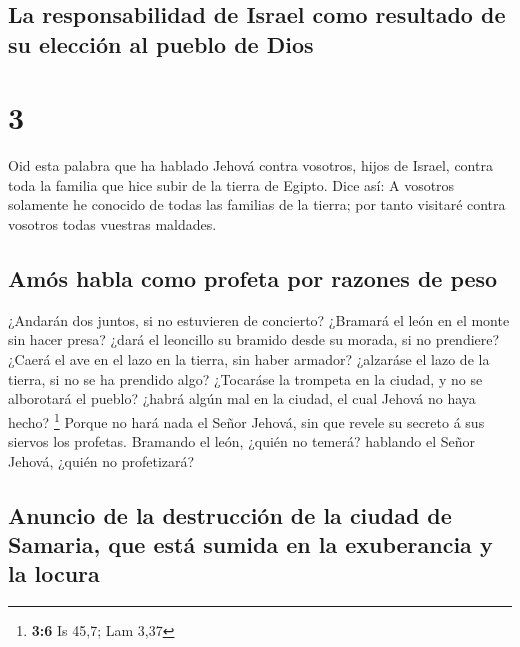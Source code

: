 \hypertarget{la-responsabilidad-de-israel-como-resultado-de-su-elecciuxf3n-al-pueblo-de-dios}{%
\subsection{La responsabilidad de Israel como resultado de su elección
al pueblo de
Dios}\label{la-responsabilidad-de-israel-como-resultado-de-su-elecciuxf3n-al-pueblo-de-dios}}

\hypertarget{section-2}{%
\section{3}\label{section-2}}

 Oid esta palabra que ha hablado Jehová contra vosotros,
hijos de Israel, contra toda la familia que hice subir de la tierra de
Egipto. Dice así:  A vosotros solamente he conocido de todas
las familias de la tierra; por tanto visitaré contra vosotros todas
vuestras maldades.

\hypertarget{amuxf3s-habla-como-profeta-por-razones-de-peso}{%
\subsection{Amós habla como profeta por razones de
peso}\label{amuxf3s-habla-como-profeta-por-razones-de-peso}}

 ¿Andarán dos juntos, si no estuvieren de concierto?
 ¿Bramará el león en el monte sin hacer presa? ¿dará el
leoncillo su bramido desde su morada, si no prendiere? 
¿Caerá el ave en el lazo en la tierra, sin haber armador? ¿alzaráse el
lazo de la tierra, si no se ha prendido algo?  ¿Tocaráse la
trompeta en la ciudad, y no se alborotará el pueblo? ¿habrá algún mal en
la ciudad, el cual Jehová no haya hecho? \footnote{\textbf{3:6} Is 45,7;
  Lam 3,37}  Porque no hará nada el Señor Jehová, sin que
revele su secreto á sus siervos los profetas.  Bramando el
león, ¿quién no temerá? hablando el Señor Jehová, ¿quién no profetizará?

\hypertarget{anuncio-de-la-destrucciuxf3n-de-la-ciudad-de-samaria-que-estuxe1-sumida-en-la-exuberancia-y-la-locura}{%
\subsection{Anuncio de la destrucción de la ciudad de Samaria, que está
sumida en la exuberancia y la
locura}\label{anuncio-de-la-destrucciuxf3n-de-la-ciudad-de-samaria-que-estuxe1-sumida-en-la-exuberancia-y-la-locura}}

